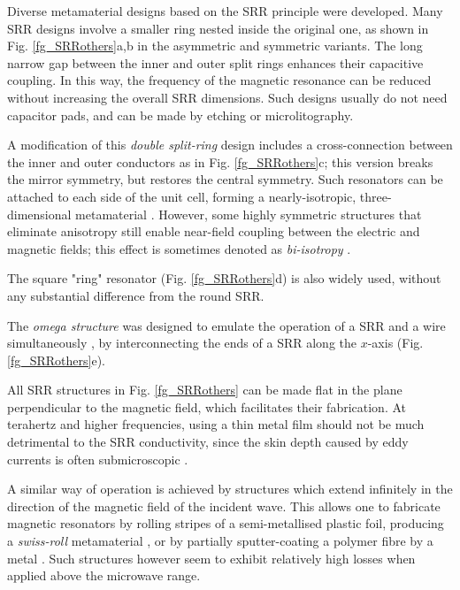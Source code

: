 Diverse metamaterial designs based on the SRR principle were developed.
Many SRR designs involve a smaller ring nested inside the original one, as shown in Fig. \ref{fg_SRRothers}a,b in the asymmetric and symmetric variants. The long narrow gap between the inner and outer split rings enhances their capacitive coupling. In this way, the frequency of the magnetic resonance can be reduced without increasing the overall SRR dimensions. Such designs usually do not need capacitor pads, and can be made by etching or microlitography. 

A modification of this \textit{double split-ring} design includes a cross-connection between the inner and outer conductors as in Fig. \ref{fg_SRRothers}c; this version breaks the mirror symmetry, but restores the central symmetry. 
Such resonators can be attached to each side of the unit cell, forming a nearly-isotropic, three-dimensional metamaterial \cite{marques2007negative}.  However, some highly symmetric structures that eliminate anisotropy still enable near-field coupling between the electric and magnetic fields; this effect is sometimes denoted as \textit{bi-isotropy} \cite{jelinek2008periodic}.



The square "ring" resonator (Fig. \ref{fg_SRRothers}d) is also widely used, without any substantial difference from the round SRR.

The \textit{omega structure} was designed to emulate the operation of a SRR and a wire simultaneously \cite[pp. 62--72]{croenne2009controle}, by interconnecting the ends of a SRR along the $x$-axis (Fig. \ref{fg_SRRothers}e).

All SRR structures in Fig. \ref{fg_SRRothers} can be made flat in the plane perpendicular to the magnetic field, which facilitates their fabrication. At terahertz and higher frequencies, using a thin metal film should not be much detrimental to the SRR conductivity, since the skin depth caused by eddy currents is often submicroscopic \cite{gibbons2010scalable}.

A similar way of operation is achieved by structures which extend infinitely in the direction of the magnetic field of the incident wave. This allows one to fabricate magnetic resonators by rolling stripes of a semi-metallised plastic foil, producing a \textit{swiss-roll} metamaterial \cite{gibbons2010scalable}, or by partially sputter-coating a polymer fibre by a metal \cite{wang2011fiber}. Such structures however seem to exhibit relatively high losses when applied above the microwave range.

